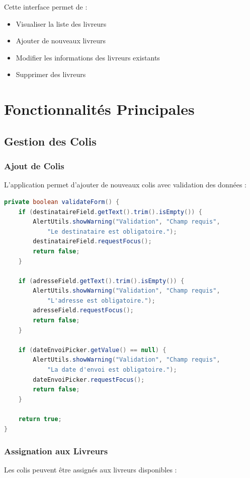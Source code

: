 \documentclass{rapportENSIAS}
\begin{document}
Cette interface permet de :
\begin{itemize}
    \item Visualiser la liste des livreurs
    \item Ajouter de nouveaux livreurs
    \item Modifier les informations des livreurs existants
    \item Supprimer des livreurs
\end{itemize}

\section{Fonctionnalit\'{e}s Principales}

\subsection{Gestion des Colis}

\subsubsection{Ajout de Colis}
L'application permet d'ajouter de nouveaux colis avec validation des donn\'{e}es :

\begin{lstlisting}[language=Java, caption=Validation des colis]
private boolean validateForm() {
    if (destinataireField.getText().trim().isEmpty()) {
        AlertUtils.showWarning("Validation", "Champ requis", 
            "Le destinataire est obligatoire.");
        destinataireField.requestFocus();
        return false;
    }
    
    if (adresseField.getText().trim().isEmpty()) {
        AlertUtils.showWarning("Validation", "Champ requis", 
            "L'adresse est obligatoire.");
        adresseField.requestFocus();
        return false;
    }
    
    if (dateEnvoiPicker.getValue() == null) {
        AlertUtils.showWarning("Validation", "Champ requis", 
            "La date d'envoi est obligatoire.");
        dateEnvoiPicker.requestFocus();
        return false;
    }
    
    return true;
}
\end{lstlisting}

\subsubsection{Assignation aux Livreurs}
Les colis peuvent \^{e}tre assign\'{e}s aux livreurs disponibles :
\end{document}
